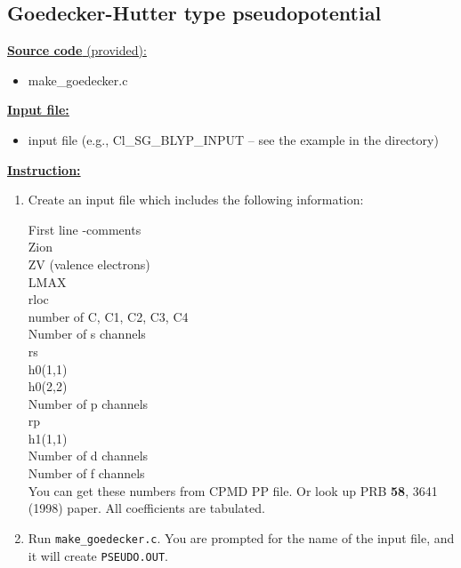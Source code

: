 


\subsection{Goedecker-Hutter type pseudopotential}

\noindent
\underline{ {\bf Source code }(provided): }
	\begin{itemize}
	\item make\_goedecker.c
	\end{itemize}

\vskip 12pt
\noindent
\underline{ {\bf Input file:} }
	\begin{itemize}
	\item input file (e.g., Cl\_SG\_BLYP\_INPUT -- see the example in the directory)
	\end{itemize}
	
	
\vskip 12pt
\noindent
\underline{ {\bf Instruction:} }

\begin{enumerate}
\item Create an input file which includes the following information:

First line -comments\\
Zion\\
ZV (valence electrons)\\
LMAX\\
rloc\\
number of C, C1, C2, C3, C4\\
Number of s channels\\
rs\\
h0(1,1)\\
h0(2,2)\\
Number of p channels\\
rp\\
h1(1,1)\\
Number of d channels\\
Number of f channels\\

You can get these numbers from CPMD PP file. Or look up PRB \textbf{58}, 3641 (1998) paper. All coefficients are tabulated.

\item Run \verb+make_goedecker.c+. You are prompted for the name of the input file, and it will create \verb+PSEUDO.OUT+.


\end{enumerate}




%

